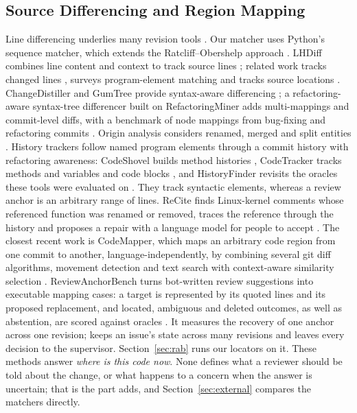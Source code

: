 \subsection{Source Differencing and Region Mapping}
Line differencing underlies many revision tools \cite{myers1986ond}. Our matcher uses Python's sequence matcher, which extends the Ratcliff--Obershelp approach \cite{ratcliff1988pattern,pythonsequence}. LHDiff combines line content and context to track source lines \cite{asaduzzaman2013lhdiff}; related work tracks changed lines \cite{canfora2007identifying}, surveys program-element matching \cite{kim2006program} and tracks source locations \cite{reiss2008tracking}. ChangeDistiller and GumTree provide syntax-aware differencing \cite{fluri2007change,falleri2014fine}; a refactoring-aware syntax-tree differencer built on RefactoringMiner adds multi-mappings and commit-level diffs, with a benchmark of node mappings from bug-fixing and refactoring commits \cite{alikhanifard2024astdiff}. Origin analysis considers renamed, merged and split entities \cite{godfrey2005using}. History trackers follow named program elements through a commit history with refactoring awareness: CodeShovel builds method histories \cite{grund2021codeshovel}, CodeTracker tracks methods and variables \cite{jodavi2022codetracker} and code blocks \cite{hasan2024blocktracking}, and HistoryFinder revisits the oracles these tools were evaluated on \cite{islam2025historyfinder}. They track syntactic elements, whereas a review anchor is an arbitrary range of lines. ReCite finds Linux-kernel comments whose referenced function was renamed or removed, traces the reference through the history and proposes a repair with a language model for people to accept \cite{sun2026recite}. The closest recent work is CodeMapper, which maps an arbitrary code region from one commit to another, language-independently, by combining several git diff algorithms, movement detection and text search with context-aware similarity selection \cite{hu2026codemapper}. ReviewAnchorBench turns bot-written review suggestions into executable mapping cases: a target is represented by its quoted lines and its proposed replacement, and located, ambiguous and deleted outcomes, as well as abstention, are scored against oracles \cite{fu2026reviewanchorbench}. It measures the recovery of one anchor across one revision; \sys{} keeps an issue's state across many revisions and leaves every decision to the supervisor. Section~\ref{sec:rab} runs our locators on it. These methods answer \emph{where is this code now}. None defines what a reviewer should be told about the change, or what happens to a concern when the answer is uncertain; that is the part \sys{} adds, and Section~\ref{sec:external} compares the matchers directly.

